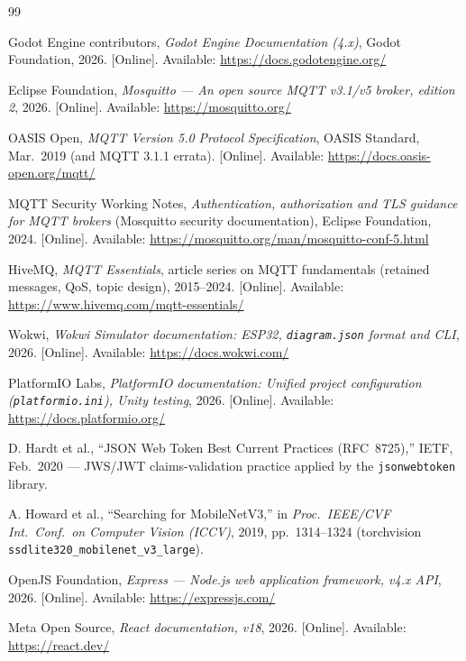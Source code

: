 \begin{thebibliography}{99}

 Godot Engine contributors, \emph{Godot Engine Documentation
(4.x)}, Godot Foundation, 2026. [Online]. Available:
\url{https://docs.godotengine.org/}

 Eclipse Foundation, \emph{Mosquitto --- An open source
MQTT v3.1/v5 broker, edition 2}, 2026. [Online]. Available:
\url{https://mosquitto.org/}

 OASIS Open, \emph{MQTT Version 5.0 Protocol
Specification}, OASIS Standard, Mar.\ 2019 (and MQTT 3.1.1 errata).
[Online]. Available: \url{https://docs.oasis-open.org/mqtt/}

 MQTT Security Working Notes, \emph{Authentication,
authorization and TLS guidance for MQTT brokers} (Mosquitto security
documentation), Eclipse Foundation, 2024. [Online]. Available:
\url{https://mosquitto.org/man/mosquitto-conf-5.html}

 HiveMQ, \emph{MQTT Essentials}, article series on
MQTT fundamentals (retained messages, QoS, topic design), 2015--2024.
[Online]. Available: \url{https://www.hivemq.com/mqtt-essentials/}

 Wokwi, \emph{Wokwi Simulator documentation: ESP32,
\texttt{diagram.json} format and CLI}, 2026. [Online]. Available:
\url{https://docs.wokwi.com/}

 PlatformIO Labs, \emph{PlatformIO documentation:
Unified project configuration (\texttt{platformio.ini}), Unity testing},
2026. [Online]. Available: \url{https://docs.platformio.org/}

 D. Hardt et al., ``JSON Web Token Best Current
Practices (RFC~8725),'' IETF, Feb.\ 2020 --- JWS/JWT claims-validation
practice applied by the \texttt{jsonwebtoken} library.

 A. Howard et al., ``Searching for MobileNetV3,'' in
\emph{Proc.\ IEEE/CVF Int.\ Conf.\ on Computer Vision (ICCV)}, 2019,
pp.\ 1314--1324 (torchvision \texttt{ssdlite320\_mobilenet\_v3\_large}).

 OpenJS Foundation, \emph{Express --- Node.js web
application framework, v4.x API}, 2026. [Online]. Available:
\url{https://expressjs.com/}

 Meta Open Source, \emph{React documentation, v18},
2026. [Online]. Available: \url{https://react.dev/}


\end{thebibliography}
